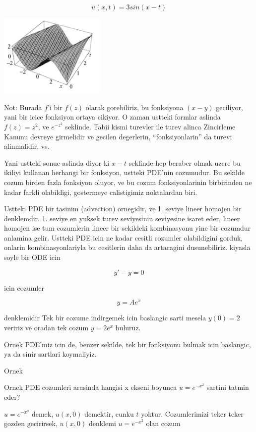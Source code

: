 \documentclass[12pt,fleqn]{article}
\begin{document}
\[ u(x,t) = 3sin(x-t) \]

\includegraphics[height=4cm]{1_4.png}

Not: Burada $f$'i bir $f(z)$ olarak gorebiliriz, bu fonksiyona $(x-y)$
geciliyor, yani bir icice fonksiyon ortaya cikiyor. O zaman ustteki formlar
aslinda $f(z) = z^2$, ve $e^{-z^2}$ seklinde. Tabii kismi turevler ile
turev alinca Zincirleme Kanunu devreye girmelidir ve gecilen degerlerin,
``fonksiyonlarin'' da turevi alinmalidir, vs. 

Yani ustteki sonuc aslinda diyor ki $x-t$ seklinde hep beraber olmak uzere
bu ikiliyi kullanan herhangi bir fonksiyon, ustteki PDE'nin cozumudur. Bu
sekilde cozum birden fazla fonksiyon oluyor, ve bu cozum fonksiyonlarinin
birbirinden ne kadar farkli olabildigi, gostermeye calistigimiz noktalardan
biri.

Ustteki PDE bir tasinim (advection) ornegidir, ve 1. seviye lineer homojen
bir denklemdir. 1. seviye en yuksek turev seviyesinin seviyesine isaret
eder, lineer homojen ise tum cozumlerin lineer bir sekildeki kombinasyonu
yine bir cozumdur anlamina gelir. Ustteki PDE icin ne kadar cesitli
cozumler olabildigini gorduk, onlarin kombinasyonlariyla bu cesitlerin daha
da artacagini dusunebiliriz. kiyasla soyle bir ODE icin

\[  y' - y  = 0\]

icin cozumler

\[ y = Ae^x \]

denklemidir Tek bir cozume indirgemek icin baslangic sarti mesela $y(0) =
2$ 
veririz ve oradan tek cozum $y = 2e^x$ buluruz. 

Ornek PDE'miz icin de, benzer sekilde, tek bir fonksiyonu bulmak icin
baslangic, ya da sinir sartlari koymaliyiz. 

Ornek

Ornek PDE cozumleri arasinda hangisi x ekseni boyunca $u = e^{-x^2}$
sartini tatmin eder? 

$u = e^{-x^2}$ demek, $u(x,0)$ demektir, cunku $t$ yoktur. Cozumlerimizi
teker teker gozden gecirirsek, $u(x,0)$ denklemi $u = e^{-x^2}$ olan
cozum
\end{document}

